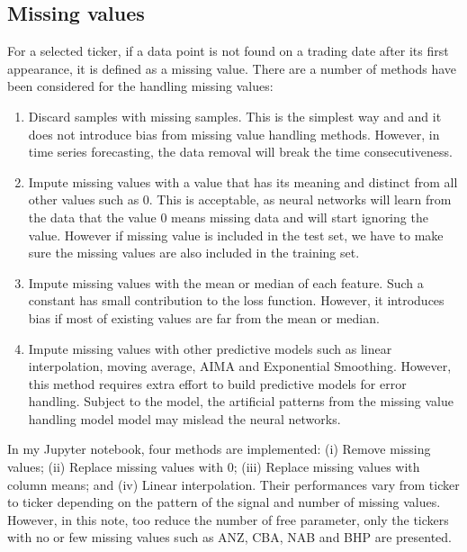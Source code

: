 \documentclass[a4paper, 11pt, usenatbib]{article}
\begin{document}
\subsection{Missing values}
For a selected ticker, if a data point is not found on a trading date after its first appearance, it is defined as a missing value. There are a number of methods have been considered for the handling missing values:
\begin{enumerate}


\item Discard samples with missing samples. This is the simplest way and and it does not introduce bias from missing value handling methods. However, in time series forecasting, the data removal will break the time consecutiveness.

\item Impute missing values with a value that has its meaning and distinct from all other values such as 0. This is acceptable, as neural networks will learn from the data that the value 0 means missing data and will start ignoring the value. However if missing value is included in the test set, we have to make sure the missing values are also included in the training set.

\item Impute missing values with the mean or median of each feature. Such a constant has small contribution to the loss function. However, it introduces bias if most of existing values are far from the mean or median.

\item Impute missing values with other predictive models such as linear interpolation, moving average, AIMA and Exponential Smoothing. However, this method requires extra effort to build predictive models for error handling. Subject to the model, the artificial patterns from the missing value handling model model may mislead the neural networks.
 
\end{enumerate}

In my Jupyter notebook, four methods are implemented: (i) Remove missing values; (ii) Replace missing values with 0; (iii) Replace missing values with column means; and (iv) Linear interpolation. Their performances vary from ticker to ticker depending on the pattern of the signal and number of missing values. However, in this note, too reduce the number of free parameter, only the tickers with no or few missing values such as ANZ, CBA, NAB and BHP are presented.
\end{document}
